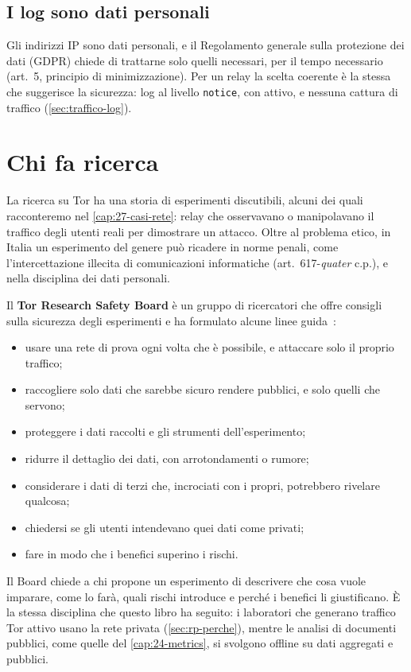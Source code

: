 \subsection{I log sono dati personali}

Gli indirizzi IP sono dati personali, e il Regolamento generale sulla protezione dei dati (GDPR) chiede di trattarne solo quelli necessari, per il tempo necessario (art.~5, principio di minimizzazione). Per un relay la scelta coerente è la stessa che suggerisce la sicurezza: log al livello \texttt{notice}, con  attivo, e nessuna cattura di traffico (\cref{sec:traffico-log}).

\section{Chi fa ricerca}\label{sec:legale-ricerca}

La ricerca su Tor ha una storia di esperimenti discutibili, alcuni dei quali racconteremo nel \cref{cap:27-casi-rete}: relay che osservavano o manipolavano il traffico degli utenti reali per dimostrare un attacco. Oltre al problema etico, in Italia un esperimento del genere può ricadere in norme penali, come l'intercettazione illecita di comunicazioni informatiche (art.~617-\emph{quater} c.p.), e nella disciplina dei dati personali.

Il \textbf{Tor Research Safety Board} è un gruppo di ricercatori che offre consigli sulla sicurezza degli esperimenti e ha formulato alcune linee guida~\cite{trsb}:
\begin{itemize}
  \item usare una rete di prova ogni volta che è possibile, e attaccare solo il proprio traffico;
  \item raccogliere solo dati che sarebbe sicuro rendere pubblici, e solo quelli che servono;
  \item proteggere i dati raccolti e gli strumenti dell'esperimento;
  \item ridurre il dettaglio dei dati, con arrotondamenti o rumore;
  \item considerare i dati di terzi che, incrociati con i propri, potrebbero rivelare qualcosa;
  \item chiedersi se gli utenti intendevano quei dati come privati;
  \item fare in modo che i benefici superino i rischi.
\end{itemize}
Il Board chiede a chi propone un esperimento di descrivere che cosa vuole imparare, come lo farà, quali rischi introduce e perché i benefici li giustificano. È la stessa disciplina che questo libro ha seguito: i laboratori che generano traffico Tor attivo usano la rete privata (\cref{sec:rp-perche}), mentre le analisi di documenti pubblici, come quelle del \cref{cap:24-metrics}, si svolgono offline su dati aggregati e pubblici.

